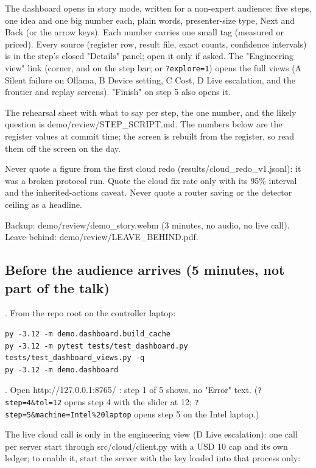
The dashboard opens in story mode, written for a non-expert audience: five steps, one idea and one big number each,
plain words, presenter-size type, Next and Back (or the arrow keys). Each number carries one small tag (measured or
priced). Every source (register row, result file, exact counts, confidence intervals) is in the step's closed
"Details" panel; open it only if asked. The "Engineering view" link (corner, and on the step bar; or \texttt{?explore=1})
opens the full views (A Silent failure on Ollama, B Device setting, C Cost, D Live escalation, and the frontier and replay
screens). "Finish" on step 5 also opens it.

The rehearsal sheet with what to say per step, the one number, and the likely question is
demo/review/STEP\_SCRIPT.md. The numbers below are the register values at commit time; the screen is rebuilt from the
register, so read them off the screen on the day.

Never quote a figure from the first cloud redo (results/cloud\_redo\_v1.jsonl): it was a broken protocol run. Quote the
cloud fix rate only with its 95\% interval and the inherited-actions caveat. Never quote a router saving or the
detector ceiling as a headline.

Backup: demo/review/demo\_story.webm (3 minutes, no audio, no live call). Leave-behind: demo/review/LEAVE\_BEHIND.pdf.

\subsection*{Before the audience arrives (5 minutes, not part of the talk)}

\par{}. From the repo root on the controller laptop:

\begin{verbatim}
py -3.12 -m demo.dashboard.build_cache
py -3.12 -m pytest tests/test_dashboard.py tests/test_dashboard_views.py -q
py -3.12 -m demo.dashboard
\end{verbatim}

\par{}. Open http://127.0.0.1:8765/ : step 1 of 5 shows, no "Error" text. (\texttt{?step=4\&tol=12} opens step 4 with the slider
at 12; \texttt{?step=5\&machine=Intel\%20laptop} opens step 5 on the Intel laptop.)

The live cloud call is only in the engineering view (D Live escalation): one call per server start through
src/cloud/client.py with a USD 10 cap and its own ledger; to enable it, start the server with the key loaded into that
process only:

